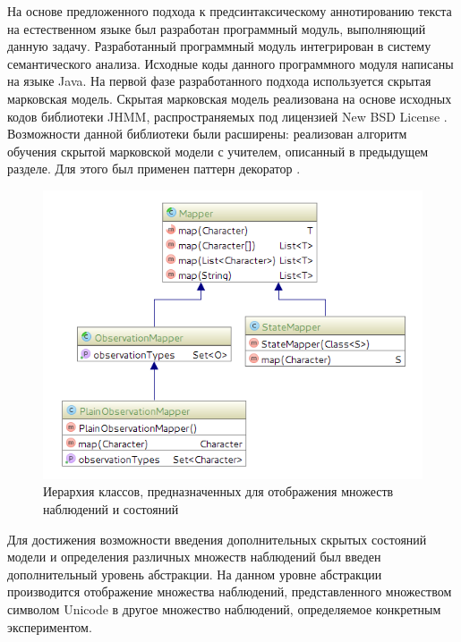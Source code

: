На основе предложенного подхода к предсинтаксическому аннотированию текста на естественном языке был разработан программный модуль, выполняющий данную задачу. Разработанный программный модуль интегрирован в систему семантического анализа. Исходные коды данного программного модуля написаны на языке Java. На первой фазе разработанного подхода используется скрытая марковская модель. Скрытая марковская модель реализована на основе исходных кодов библиотеки JHMM, распространяемых под лицензией New BSD License \cite{nbsd}. Возможности данной библиотеки были расширены: реализован алгоритм обучения скрытой марковской модели с учителем, описанный в предыдущем разделе. Для этого был применен паттерн декоратор \cite{gof}.
\begin{figure}[H]
	\centering
	\includegraphics[scale=0.7]{img/uml_mappers.png}
	\caption{Иерархия классов, предназначенных для отображения множеств наблюдений и состояний}
\end{figure}
Для достижения возможности введения дополнительных скрытых состояний модели и определения различных множеств наблюдений был введен дополнительный уровень абстракции. На данном уровне абстракции производится отображение множества наблюдений, представленного множеством символом Unicode в другое множество наблюдений, определяемое конкретным экспериментом. 

